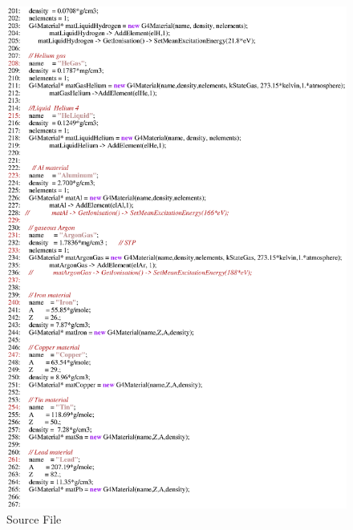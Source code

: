 \begin{figure}[h]
  \hspace{0cm}
  \includegraphics[scale=0.8]{./figures17/QweakSimMaterial.cc-p4.eps}
  \caption{\label{SourceXVII5} Source File}
           \label{fig:XVII-SC-5}
\end{figure}
\clearpage

